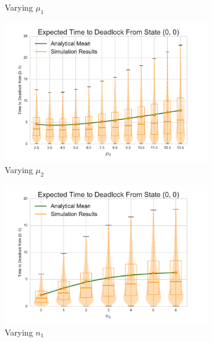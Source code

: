 \documentclass{article}
\begin{document}
\begin{figure}[!htbp]
\begin{subfigure}[b]{0.5\textwidth}
  \caption{Varying $\mu_1$}
  \label{fig:timestodeadlockfb_mu1}
\end{subfigure}
\begin{subfigure}[b]{0.5\textwidth}
  \includegraphics[width=\textwidth]{images/vary_mu2fb}
  \caption{Varying $\mu_2$}
  \label{fig:timestodeadlockfb_mu2}
\end{subfigure}
\begin{subfigure}[b]{0.5\textwidth}
  \includegraphics[width=\textwidth]{images/vary_n1fb}
  \caption{Varying $n_1$}
  \label{fig:timestodeadlockfb_n1}
\end{subfigure}
\begin{subfigure}[b]{0.5\textwidth}

\end{subfigure}
\end{figure}
\end{document}
